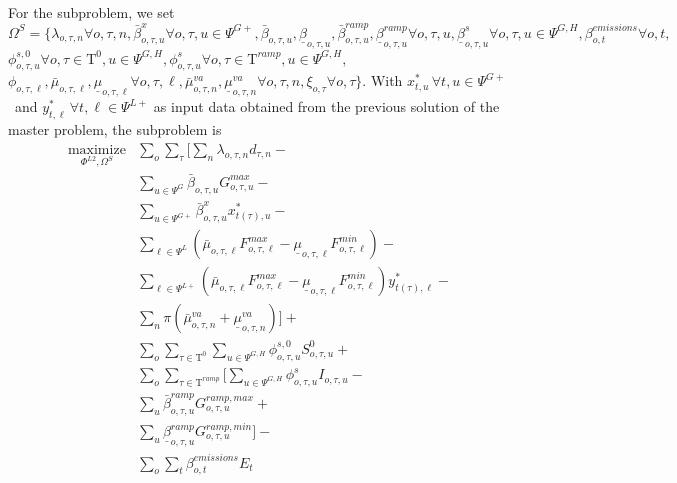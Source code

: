 \documentclass[final]{IEEEtran}
\newcommand{\Tau}{\mathrm{T}}
\begin{document}
For the subproblem, we set $\Omega^{S} = \{ \lambda_{o, \tau, n} \forall o, \tau, n, \bar{\beta}^x_{o, \tau, u} \forall o, \tau, u \in \Psi^{G+}, \bar{\beta}_{o, \tau, u},  \underline{\beta}_{o, \tau, u}, \bar{\beta}_{o, \tau, u}^{ramp}, \underline{\beta}_{o, \tau, u}^{ramp} \forall o, \tau, u, \underline{\beta}_{o, \tau, u}^{s} \forall o, \tau, u \in \Psi^{G, H}, \beta_{o, t}^{emissions} \forall o, t,$ $\phi_{o, \tau, u}^{s,0} \forall o, \tau \in \Tau^0, u \in \Psi^{G, H}, \phi_{o, \tau, u}^{s} \forall o, \tau \in \Tau^{ramp}, u \in \Psi^{G, H},$ $\phi_{o, \tau, \ell}, \bar{\mu}_{o, \tau, \ell}, \underline{\mu}_{o, \tau, \ell} \forall o, \tau, \ell, \bar{\mu}^{va}_{o, \tau, n}, \underline{\mu}^{va}_{o, \tau, n} \forall o, \tau, n, \xi_{o, \tau}  \forall o, \tau \}$. With $x_{t, u}^* \, \forall t, u \in \Psi^{G+}$ and $y_{t, \ell}^* \, \forall t, \ell \in \Psi^{L+}$ as input data obtained from the previous solution of the master problem, the subproblem is
\begin{align}
\label{sub_obj} \underset{\Phi^{L2}, \Omega^{S}}{\text{maximize}} &\sum\limits_o \sum\limits_{\tau} \Bigg[ \sum\limits_n \lambda_{o, \tau, n} d_{\tau, n} - \nonumber \\
&\sum\limits_{u \in \Psi^G} \bar{\beta}_{o, \tau, u} G_{o, \tau, u}^{max} - \nonumber \\
&\sum\limits_{u \in \Psi^{G+}} \bar{\beta}^x_{o, \tau, u} x_{t(\tau), u}^* - \nonumber \\
&\sum\limits_{\ell \in \Psi^L} \left( \bar{\mu}_{o, \tau, \ell} F_{o, \tau, \ell}^{max} - \underline{\mu}_{o, \tau, \ell} F_{o, \tau, \ell}^{min} \right) - \nonumber \\
&\sum\limits_{\ell \in \Psi^{L+}} \left( \bar{\mu}_{o, \tau, \ell} F_{o, \tau, \ell}^{max} - \underline{\mu}_{o, \tau, \ell} F_{o, \tau, \ell}^{min} \right) y_{t(\tau), \ell}^* - \nonumber \\
&\sum\limits_{n} \pi ( \bar{\mu}^{va}_{o, \tau, n} + \underline{\mu}^{va}_{o, \tau, n} ) \Bigg] + \nonumber \\
&\sum\limits_{o} \sum\limits_{\tau \in \Tau^{0}} \sum\limits_{u \in \Psi^{G, H}} \phi_{o, \tau, u}^{s,0} S^{0}_{o, \tau, u} + \nonumber \\
&\sum\limits_{o} \sum\limits_{\tau \in \Tau^{ramp}} \Bigg[ \sum\limits_{u \in \Psi^{G, H}} \phi_{o, \tau, u}^{s} I_{o, \tau, u} - \nonumber \\
&\sum\limits_{u} \bar{\beta}_{o, \tau, u}^{ramp} G^{ramp,max}_{o, \tau, u} + \nonumber \\
&\sum\limits_{u} \underline{\beta}_{o, \tau, u}^{ramp} G^{ramp,min}_{o, \tau, u} \Bigg] - \nonumber \\
&\sum\limits_{o} \sum\limits_{t} \beta_{o, t}^{emissions} E_{t}
\end{align}
\end{document}
